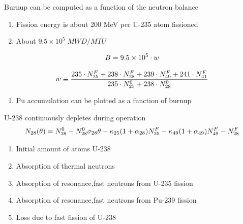 \documentclass[aspectratio=1610,pdftex,dvipsnames,compress,xcolor={dvipsnames}]{beamer}
\begin{document}
\begin{frame}{Burnup can be computed as a function of the neutron balance}
    \begin{enumerate}[series=outerlist,topsep=0pt,itemsep=7pt,leftmargin=*,label=(\arabic*)]
        \item[]Fission energy is about 200 MeV per U-235 atom fissioned
        \item[]About $9.5 \times 10^5 \; MWD/MTU$
    \end{enumerate}

    \vspace*{\fill}

    \begin{equation}
        \LARGE
        B=9.5 \times 10^5 \cdot w
    \end{equation}
    
    \begin{equation}
        \LARGE
        w \equiv \frac{235\cdot N_{25}^F + 238\cdot N_{28}^F + 239\cdot N_{49}^F  + 241\cdot N_{41}^F}{235\cdot N_{25}^0 + 238\cdot N_{28}^0}
    \end{equation}

    \vspace*{\fill}

    \begin{enumerate}[series=outerlist,topsep=0pt,itemsep=7pt,leftmargin=*,label=(\arabic*)]
        \item[]Pu accumulation can be plotted as a function of burnup
    \end{enumerate}
\end{frame}


\begin{frame}{U-238 continuously depletes during operation}
    \begin{equation}
        \Large
        N_{28}(\theta)=N_{28}^0-N_{28}^0\sigma_{28}\theta-\kappa_{25}(1 + \alpha_{28})N_{25}^F-\kappa_{49}(1 + \alpha_{49})N_{49}^F-N_{28}^F
    \end{equation}
    
    \vspace*{\fill}

    \begin{enumerate}[series=outerlist,topsep=0pt,itemsep=21pt,leftmargin=*,label=(\arabic*)]
        \item[]Initial amount of atoms U-238
        \item[]Absorption of thermal neutrons
        \item[]Absorption of resonance,fast neutrons from U-235 fission
        \item[]Absorption of resonance,fast neutrons from Pu-239 fission
        \item[]Loss due to fast fission of U-238
    \end{enumerate}
\end{frame}
\end{document}
